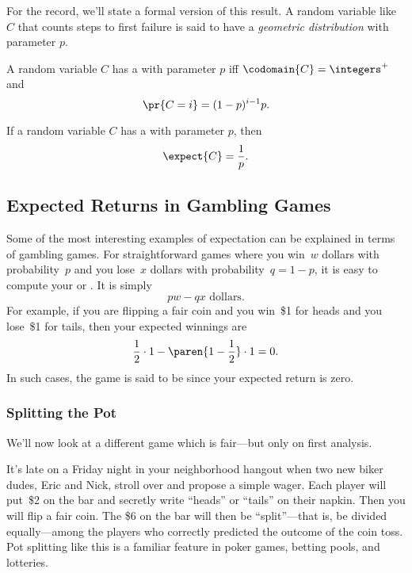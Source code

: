 For the record, we'll state a formal version of this result.  A random
variable like $C$ that counts steps to first failure is said to have a
\emph{geometric distribution} with parameter $p$.
\begin{definition}\label{def:geometric_distribution}
A random variable $C$ has a  with
parameter $p$ iff $\codomain{C} = \integers^+$ and
\[
\pr{C=i} = (1-p)^{i-1}p.
\]
\end{definition}

\begin{lemma}\label{lem:exp_time_to_fail}
If a random variable $C$ has a  with
parameter $p$, then
\begin{equation}\label{exp_time_to_fail}
    \expect{C} = \frac{1}{p}.
\end{equation}
\end{lemma}

\subsection{Expected Returns in Gambling Games}

Some of the most interesting examples of expectation can be explained
in terms of gambling games.  For straightforward games where you
win~$w$ dollars with probability~$p$ and you lose~$x$ dollars with
probability~$q = 1 - p$, it is easy to compute your 
or .  It is simply
\[
    p w - q x \text{ dollars}.
\]
For example, if you are flipping a fair coin and you win~\$1 for heads
and you lose~\$1 for tails, then your expected winnings are
\[
    \frac{1}{2} \cdot 1 - \paren{1 - \frac{1}{2}} \cdot 1 = 0.
\]
In such cases, the game is said to be  since your expected
return is zero.

\subsubsection{Splitting the Pot}

We'll now look at a different game which is fair---but only on first
analysis.

It's late on a Friday night in your neighborhood hangout when two new
biker dudes, Eric and Nick, stroll over and propose a simple wager.
Each player will put~\$2 on the bar and secretly write ``heads'' or
``tails'' on their napkin.  Then you will flip a fair coin.
The \$6 on the bar will then be ``split''---that is, be divided
equally---among the players who correctly predicted the outcome of
the coin toss.  Pot splitting like this is a familiar feature in poker
games, betting pools, and lotteries.

